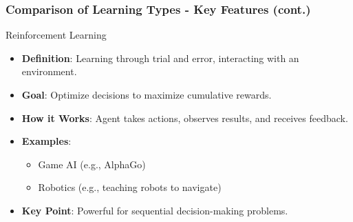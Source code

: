 \documentclass[aspectratio=169]{beamer}
\begin{document}
\begin{frame}[fragile]
    \frametitle{Comparison of Learning Types - Key Features (cont.)}
    \begin{block}{Reinforcement Learning}
        \begin{itemize}
            \item \textbf{Definition}: Learning through trial and error, interacting with an environment.
            \item \textbf{Goal}: Optimize decisions to maximize cumulative rewards.
            \item \textbf{How it Works}: Agent takes actions, observes results, and receives feedback.
            \item \textbf{Examples}: 
            \begin{itemize}
                \item Game AI (e.g., AlphaGo)
                \item Robotics (e.g., teaching robots to navigate)
            \end{itemize}
            \item \textbf{Key Point}: Powerful for sequential decision-making problems.
        \end{itemize}
    \end{block}
\end{frame}
\end{document}
